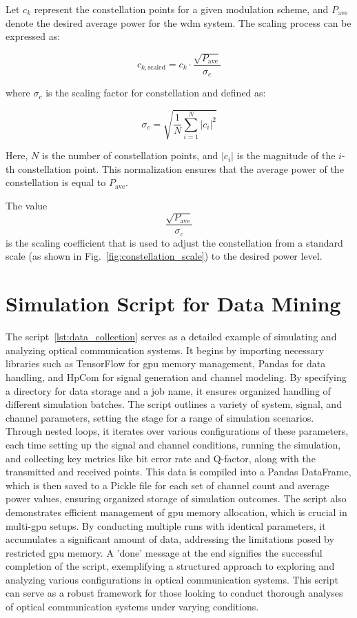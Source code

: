 Let $c_k$ represent the constellation points for a given modulation scheme, and $P_{\text{ave}}$ denote the desired average power for the \acrshort{wdm} system. The scaling process can be expressed as:

\[
c_{k,\text{scaled}} = c_k \cdot \frac{\sqrt{P_{\text{ave}}}}{\sigma_{c}}
\]

where $\sigma_{c}$ is the scaling factor for constellation and defined as:

\[
\sigma_{c} = \sqrt{\frac{1}{N} \sum_{i=1}^{N} |c_i|^2}
\]

Here, $N$ is the number of constellation points, and $|c_i|$ is the magnitude of the $i$-th constellation point. This normalization ensures that the average power of the constellation is equal to $P_{\text{ave}}$.

The value 
\[
\frac{\sqrt{P_{\text{ave}}}}{\sigma_{c}}
\]
is the scaling coefficient that is used to adjust the constellation from a standard scale (as shown in Fig.~\ref{fig:constellation_scale}) to the desired power level.


\section{Simulation Script for Data Mining}

The script~\ref{lst:data_collection} serves as a detailed example of simulating and analyzing optical communication systems. It begins by importing necessary libraries such as TensorFlow for \acrshort{gpu} memory management, Pandas for data handling, and HpCom for signal generation and channel modeling. By specifying a directory for data storage and a job name, it ensures organized handling of different simulation batches. The script outlines a variety of system, signal, and channel parameters, setting the stage for a range of simulation scenarios. Through nested loops, it iterates over various configurations of these parameters, each time setting up the signal and channel conditions, running the simulation, and collecting key metrics like bit error rate and Q-factor, along with the transmitted and received points. This data is compiled into a Pandas DataFrame, which is then saved to a Pickle file for each set of channel count and average power values, ensuring organized storage of simulation outcomes. The script also demonstrates efficient management of \acrshort{gpu} memory allocation, which is crucial in multi-\acrshort{gpu} setups. By conducting multiple runs with identical parameters, it accumulates a significant amount of data, addressing the limitations posed by restricted \acrshort{gpu} memory. A 'done' message at the end signifies the successful completion of the script, exemplifying a structured approach to exploring and analyzing various configurations in optical communication systems. This script can serve as a robust framework for those looking to conduct thorough analyses of optical communication systems under varying conditions.

